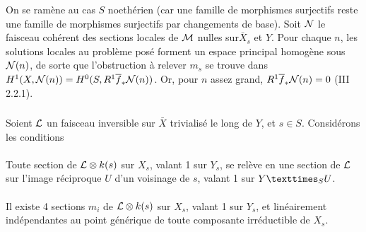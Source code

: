 \documentclass[10pt]{../fichiers-configuration-latex/smfart}
\begin{document}
On se ramène au cas $S$ noethérien (car une famille de morphismes
surjectifs reste une famille de morphismes surjectifs par changements de
base).
Soit ${\mathcal N}$ le faisceau cohérent des sections locales
de ${\mathcal M}$ nulles sur\pageoriginale $\bar{X}_{s}$ et $Y$. Pour
chaque $n$, les solutions locales au problème posé forment un espace
principal homogène sous ${\mathcal N}(n)$, de sorte que l'obstruction à
relever $m_{s}$ se trouve dans
$H^{1}(X,{\mathcal N}(n))=H^{0}(S,R^{1}\overline{f}_{\ast}{\mathcal N}(n))$. Or,
pour $n$ assez grand, $R^{1}\overline{f}_{\ast}{\mathcal N}(n)=0$ (\EGA III 2.2.1).

\setcounter{subsubsection}{9}
\subsubsection{}
Soient ${\mathcal L}$ un faisceau inversible sur $\bar{X}$ trivialisé
le long de $Y$, et $s\in S$. Considérons les conditions

\paragraph{}
Toute section de ${\mathcal L}\otimes k(s)$ sur $X_{s}$, valant 1 sur
$Y_{s}$, se relève en une section de ${\mathcal L}$ sur l'image
réciproque $U$ d'un voisinage de $s$, valant 1 sur $\fprod{Y}{U}{S}$.

\paragraph{}
Il existe 4 sections $m_{i}$ de ${\mathcal L}\otimes k(s)$ sur $X_{s}$,
valant 1 sur $Y_s$, et linéairement indépendantes au point générique de
toute composante irréductible de $X_{s}$.
\end{document}
